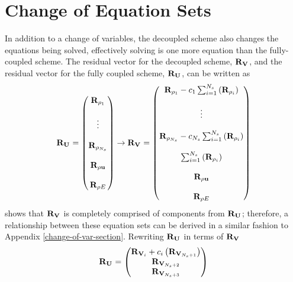 \section{Change of Equation Sets}
\label{sec:change-of-equations}

In addition to a change of variables, the decoupled scheme also changes the
equations being solved, effectively solving is one more equation than the
fully-coupled scheme.  The residual vector for the decoupled scheme, $\mathbf R_{{\mathbf V}_{}}$,
and the residual vector for the fully coupled scheme, $\mathbf R_{{\mathbf U}_{}}$, can be written as
\begin{equation}
  \mathbf R_{{\mathbf U}_{}} =
  \begin{pmatrix}
    \mathbf R_{\rho_1} \\ \\
    \vdots \\ \\
    \mathbf R_{\rho_{N_s}} \\ \\
    \mathbf R_{\rho \mathbf u} \\ \\
    \mathbf R_{\rho E}
  \end{pmatrix}
  \rightarrow
  \mathbf R_{{\mathbf V}_{}} =
  \begin{pmatrix}
    \mathbf R_{\rho_1} - c_1 \sum_{i=1}^{N_s}\left(\mathbf R_{\rho_i}\right) \\ \\
    \vdots \\ \\
    \mathbf R_{\rho_{N_s}} - c_{N_s} \sum_{i=1}^{N_s}\left(\mathbf R_{\rho_i}\right) \\ \\
    \sum_{i=1}^{N_s}\left(\mathbf R_{\rho_i}\right) \\ \\
    \mathbf R_{\rho \mathbf u} \\ \\
    \mathbf R_{\rho E}
  \end{pmatrix}
  \label{fc-dc-res}
\end{equation}
 shows that $\mathbf R_{{\mathbf V}_{}}$ is completely comprised of components from
$\mathbf R_{{\mathbf U}_{}}$; therefore, a relationship between these equation sets can be derived in
a similar fashion to Appendix \ref{change-of-var-section}.  Rewriting $\mathbf R_{{\mathbf U}_{}}$ in
terms of $\mathbf R_{{\mathbf V}_{}}$
\begin{equation}
  \mathbf R_{{\mathbf U}_{}} =
  \begin{pmatrix}
    \mathbf R_{{\mathbf V}_{i}} + c_i \left(\mathbf R_{{\mathbf V}_{N_s+1}} \right) \\
    \mathbf R_{{\mathbf V}_{N_s+2}} \\
    \mathbf R_{{\mathbf V}_{N_s+3}}
  \end{pmatrix}
  \label{ru-to-rv}
\end{equation}
